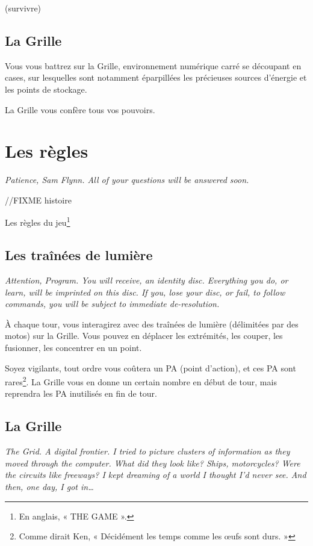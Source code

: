 (survivre)

\subsection{La Grille}
Vous vous battrez sur la Grille, environnement numérique carré se découpant en cases, sur lesquelles sont notamment éparpillées les précieuses sources d'énergie et les points de stockage.

La Grille vous confère tous vos pouvoirs.

\newpage
\section{Les règles}

\emph{Patience, Sam Flynn. All of your questions will be answered soon.}

//FIXME histoire

Les règles du jeu\footnote{En anglais, « THE GAME ».}

        \subsection{Les traînées de lumière}

        \emph{Attention, Program. You will receive, an identity disc. Everything you do, or learn, will be imprinted on this disc. If you, lose your disc, or fail, to follow commands, you will be subject to immediate de-resolution.}\\

À chaque tour, vous interagirez avec des traînées de lumière (délimitées par des motos) sur la Grille. Vous pouvez en déplacer les extrémités, les couper, les fusionner, les concentrer en un point.

Soyez vigilants, tout ordre vous coûtera un PA (point d'action), et ces PA sont rares\footnote{Comme dirait Ken, « Décidément les temps comme les œufs sont durs. »}. La Grille vous en donne un certain
nombre en début de tour, mais reprendra les PA inutilisés en fin de tour.

\subsection{La Grille}
        \emph{The Grid. A digital frontier. I tried to picture clusters
          of information as they moved through the computer. What did they
          look like? Ships, motorcycles? Were the circuits like freeways? I
          kept dreaming of a world I thought I'd never see. And then, one
          day, I got in\ldots{}}\\

